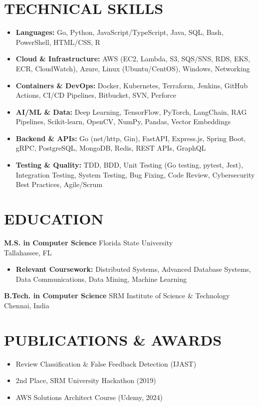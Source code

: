 \documentclass[letterpaper,10pt]{article}
\newcommand{\resumeItem}[1]{\item\small #1}
\newcommand{\resumeSubheading}[4]{
  \vspace{6pt}
  \noindent
  \textbf{#1} \hfill {\footnotesize #2} \\
  [-1pt]
  \noindent
  \small #3 \hfill {\small #4}
  \vspace{3pt}
}
\newcommand{\resumeItemsStart}{\vspace{-2pt}\begin{itemize}}
\newcommand{\resumeItemsEnd}{\end{itemize}\vspace{6pt}}
\begin{document}
\section{\textcolor{metablue}{TECHNICAL SKILLS}}
\vspace{-5pt}
\small
\begin{itemize}
\resumeItem{\textbf{Languages:} Go, Python, JavaScript/TypeScript, Java, SQL, Bash, PowerShell, HTML/CSS, R}
\resumeItem{\textbf{Cloud \& Infrastructure:} AWS (EC2, Lambda, S3, SQS/SNS, RDS, EKS, ECR, CloudWatch), Azure, Linux (Ubuntu/CentOS), Windows, Networking}
\resumeItem{\textbf{Containers \& DevOps:} Docker, Kubernetes, Terraform, Jenkins, GitHub Actions, CI/CD Pipelines, Bitbucket, SVN, Perforce}
\resumeItem{\textbf{AI/ML \& Data:} Deep Learning, TensorFlow, PyTorch, LangChain, RAG Pipelines, Scikit-learn, OpenCV, NumPy, Pandas, Vector Embeddings}
\resumeItem{\textbf{Backend \& APIs:} Go (net/http, Gin), FastAPI, Express.js, Spring Boot, gRPC, PostgreSQL, MongoDB, Redis, REST APIs, GraphQL}
\resumeItem{\textbf{Testing \& Quality:} TDD, BDD, Unit Testing (Go testing, pytest, Jest), Integration Testing, System Testing, Bug Fixing, Code Review, Cybersecurity Best Practices, Agile/Scrum}
\end{itemize}
\vspace{-10pt}


\section{\textcolor{metablue}{EDUCATION}}
\vspace{-10pt}
\resumeSubheading
{M.S. in Computer Science}{Florida State University}{}{Tallahassee, FL}
\resumeItemsStart
\resumeItem{\textbf{Relevant Coursework:} Distributed Systems, Advanced Database Systems, Data Communications, Data Mining, Machine Learning}
\resumeItemsEnd
\vspace{-5pt}
\resumeSubheading
{B.Tech. in Computer Science}{SRM Institute of Science \& Technology}{}{Chennai, India}
\vspace{-10pt}

\section{\textcolor{metablue}{PUBLICATIONS \& AWARDS}}
\vspace{-5pt}
\begin{itemize}
\resumeItem{Review Classification \& False Feedback Detection (IJAST)}
\resumeItem{2nd Place, SRM University Hackathon (2019)}
\resumeItem{AWS Solutions Architect Course (Udemy, 2024)}
\end{itemize}
\end{document}
